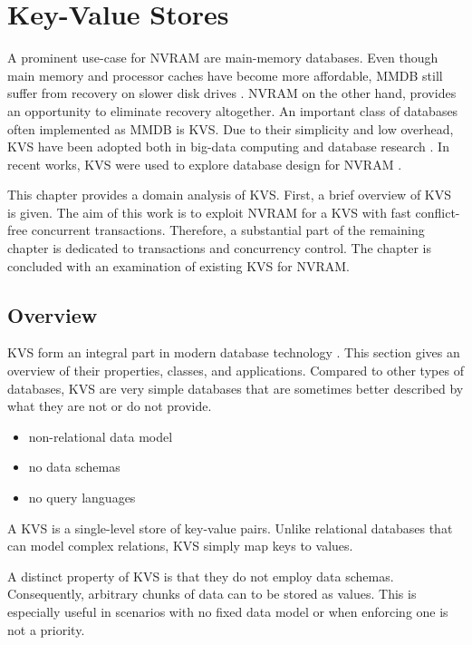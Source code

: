 \chapter{Key-Value Stores}
\label{ch:kvs}

A prominent use-case for NVRAM are main-memory databases. Even though main
memory and processor caches have become more affordable, MMDB still suffer from
recovery on slower disk drives \cite{oukid2015instant, schwalb2016hyrise}. NVRAM
on the other hand, provides an opportunity to eliminate recovery altogether. An
important class of databases often implemented as MMDB is KVS. Due to their
simplicity and low overhead, KVS have been adopted both in big-data computing
and database research \cite{decandia2007dynamo, lakshman2010cassandra,
wang2015hydradb}. In recent works, KVS were used to explore database design for
NVRAM \cite{bailey2013exploring, zhou2016nvht, wu2016nvmcached}.

This chapter provides a domain analysis of KVS. First, a brief overview of KVS
is given. The aim of this work is to exploit NVRAM for a KVS with fast
conflict-free concurrent transactions. Therefore, a substantial part of the
remaining chapter is dedicated to transactions and concurrency control. The
chapter is concluded with an examination of existing KVS for NVRAM.

\section{Overview}

KVS form an integral part in modern database technology \cite{fiebig2016one}.
This section gives an overview of their properties, classes, and applications.
Compared to other types of databases, KVS are very simple databases that are
sometimes better described by what they are not or do not provide.

\begin{itemize}
    \item non-relational data model
    \item no data schemas
    \item no query languages
\end{itemize}

A KVS is a single-level store of key-value pairs. Unlike relational databases
that can model complex relations, KVS simply map keys to values.


A distinct property of KVS is that they do not employ data schemas.
Consequently, arbitrary chunks of data can to be stored as values. This is
especially useful in scenarios with no fixed data model or when enforcing one is
not a priority.


